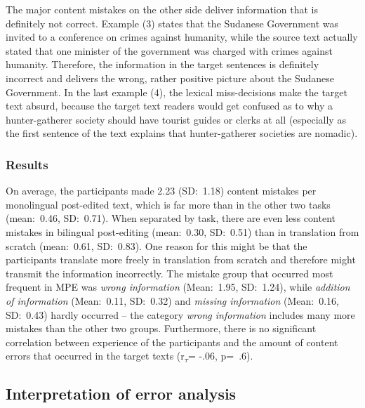 \documentclass[output=paper]{langsci/langscibook}
\begin{document}
The major content mistakes on the other side deliver information that is definitely not correct. Example (3) states that the Sudanese Government was invited to a conference on crimes against humanity, while the source text actually stated that one minister of the government was charged with crimes against humanity. Therefore, the information in the target sentences is definitely incorrect and delivers the wrong, rather positive picture about the Sudanese Government. In the last example (4), the lexical miss-decisions make the target text absurd, because the target text readers would get confused as to why a hunter-gatherer society should have tourist guides or clerks at all (especially as the first sentence of the text explains that hunter-gatherer societies are nomadic).


\subsubsection{Results\label{nitzke:sec:Results}}

\largerpage[-2]
On average, the participants made 2.23 (SD:~1.18) content mistakes per monolingual post-edited text, which is far more than in the other two tasks (mean:~0.46, SD:~0.71). When separated by task, there are even less content mistakes in bilingual post-editing (mean:~0.30, SD:~0.51) than in translation from scratch (mean:~0.61, SD:~0.83). One reason for this might be that the participants translate more freely in translation from scratch and therefore might transmit the information incorrectly. The mistake group that occurred most frequent in MPE was \textit{wrong information} (Mean:~1.95, SD:~1.24), while \textit{addition of information} (Mean:~0.11, SD:~0.32) and \textit{missing information }(Mean:~0.16, SD:~0.43) hardly occurred -- the category \textit{wrong information }includes many more mistakes than the other two groups. Furthermore, there is no significant correlation between experience of the participants and the amount of content errors that occurred in the target texts (r\textsubscript{$\tau $}= -.06, p=~.6).

\subsection{Interpretation of error analysis\label{nitzke:sec:InterpretationOfErrorAnalysis}}
\end{document}
